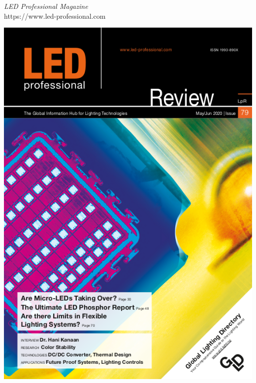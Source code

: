     \vfill
    \begin{minipage}{0.6\linewidth}\raggedright\Large
            \textit{LED Professional Magazine}\\
            https://www.led-professional.com
        \end{minipage}\begin{minipage}{0.4\linewidth}\raggedleft
            \includegraphics[width=\linewidth]{./FullPages/ledprofessional}
    \end{minipage}

